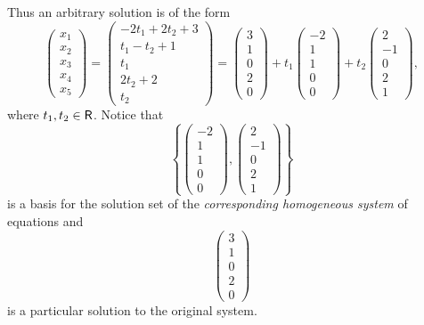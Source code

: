 Thus an arbitrary solution is of the form
\[
    \left(\begin{array}{l} x_{1} \\ x_{2} \\ x_{3} \\ x_{4} \\ x_{5} \end{array}\right)
    = \left(\begin{array}{c}
        -2 t_{1}+2 t_{2}+3 \\
        t_{1}-t_{2}+1 \\
        t_{1} \\
        2 t_{2}+2 \\
        t_{2}
    \end{array}\right)
    = \left(\begin{array}{l} 3 \\ 1 \\ 0 \\ 2 \\ 0 \end{array}\right)
    + t_{1} \left(\begin{array}{r} -2 \\ 1 \\ 1 \\ 0 \\ 0 \end{array}\right)
    + t_{2}\left(\begin{array}{r} 2 \\ -1 \\ 0 \\ 2 \\ 1 \end{array}\right),
\]
where \(t_1, t_2 \in \textsf{R}\).
Notice that
\[
    \left\{
    \left(\begin{array}{r} -2 \\ 1 \\ 1 \\ 0 \\ 0 \end{array}\right),
    \left(\begin{array}{r} 2 \\ -1 \\ 0 \\ 2 \\ 1 \end{array}\right)
    \right\}
\]
is a basis for the solution set of the \emph{corresponding homogeneous system} of equations and
\[
    \left(\begin{array}{l} 3 \\ 1 \\ 0 \\ 2 \\ 0 \end{array}\right)
\]
is a particular solution to the original system.

